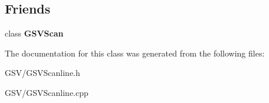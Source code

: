\subsection*{Friends}
\begin{DoxyCompactItemize}
\item 
class {\bfseries G\+S\+V\+Scan}\hypertarget{class_g_s_v_scanline_a86a1029a97364842768ff30c687d655d}{}\label{class_g_s_v_scanline_a86a1029a97364842768ff30c687d655d}

\end{DoxyCompactItemize}


The documentation for this class was generated from the following files\+:\begin{DoxyCompactItemize}
\item 
G\+S\+V/G\+S\+V\+Scanline.\+h\item 
G\+S\+V/G\+S\+V\+Scanline.\+cpp\end{DoxyCompactItemize}
